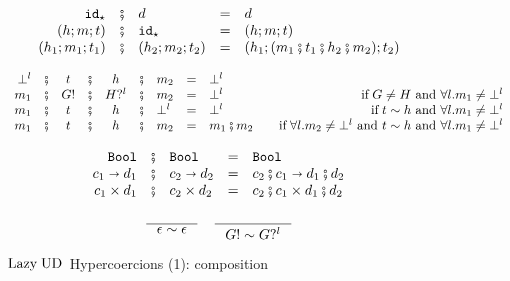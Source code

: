 \documentclass[runningheads]{llncs}
\newcommand{\infr}[2]{\inference{#1}{#2}}
\newcommand{\sidecond}[1]{\text{if}\;#1}
\newcommand{\LUD}{\ensuremath{\text{Lazy\;UD}}}
\newcommand{\Tdyn}[0]{\ensuremath{\star}}
\newcommand{\Pbool}[0]{\ensuremath{\mathtt{Bool}}}
\newcommand{\Pfunc}[2]{\ensuremath{#1 \shortrightarrow #2}}
\newcommand{\Pprod}[2]{\ensuremath{#1 \times #2}}
\newcommand{\cnfid}[1]{\ensuremath{\mathtt{id}_{#1}}}
\newcommand{\hcci}[0]{\cnfid{\Tdyn}}
\newcommand{\hccc}[3]{\ensuremath{(#1;#2;#3)}}
\newcommand{\hche}[0]{\ensuremath{\epsilon}}
\newcommand{\hchp}[2]{\ensuremath{#1?^{#2}}}
\newcommand{\hcmbool}[0]{\Pbool}
\newcommand{\hcmfunc}[2]{\Pfunc{#1}{#2}}
\newcommand{\hcmprod}[2]{\Pprod{#1}{#2}}
\newcommand{\hcmfail}[1]{\ensuremath{\bot^l}}
\newcommand{\hcte}[0]{\ensuremath{\epsilon}}
\newcommand{\hcti}[1]{\ensuremath{#1!}}
\newcommand{\compatibletailhead}[2]{\ensuremath{#1\sim#2}}
\begin{document}
\begin{figure}[tp]
	\[
	\begin{array}{rclcl}
		\hcci          
		& \fatsemi & d
		& = & d \\
		\hccc{h}{m}{t}
		& \fatsemi & \hcci
		& = & \hccc{h}{m}{t} \\
		\hccc{h_1}{m_1}{t_1}
		& \fatsemi & \hccc{h_2}{m_2}{t_2}
		& = & \hccc{h_1}{(m_1 \fatsemi t_1 \fatsemi h_2 \fatsemi m_2)}{t_2}
	\end{array}
	\]

	\[
	\begin{array}{rccccclclr}
	\hcmfail{l} 
	& \fatsemi & t
	& \fatsemi & h
	& \fatsemi & m_2
	& = & \hcmfail{l} \\
	m_1
	& \fatsemi & \hcti{G}
	& \fatsemi & \hchp{H}{l}
	& \fatsemi & m_2
	& = & \hcmfail{l}
	& \sidecond{G \neq H \text{ and } \forall l. m_1 \neq \hcmfail{l}} \\
	m_1
	& \fatsemi & t
	& \fatsemi & h
	& \fatsemi & \hcmfail{l}
	& = & \hcmfail{l}
	& \sidecond{\compatibletailhead{t}{h}
		\text{ and } \forall l. m_1 \neq \hcmfail{l}} \\
	m_1
	& \fatsemi & t
	& \fatsemi & h
	& \fatsemi & m_2
	& = & m_1 \fatsemi m_2
	& \quad \sidecond{
		\forall l. m_2 \neq \hcmfail{l}
		\text{ and } \compatibletailhead{t}{h}
		\text{ and } \forall l. m_1 \neq \hcmfail{l}} \\
	\end{array}
	\]
	
	\[
	\begin{array}{rclcl}
	\hcmbool
	& \fatsemi & \hcmbool
	& = & \hcmbool \\
	\hcmfunc{c_1}{d_1}
	& \fatsemi & \hcmfunc{c_2}{d_2}
	& = & \hcmfunc{c_2 \fatsemi c_1}{d_1 \fatsemi d_2} \\
	\hcmprod{c_1}{d_1}
	& \fatsemi & \hcmprod{c_2}{d_2}
	& = & \hcmprod{c_2 \fatsemi c_1}{d_1 \fatsemi d_2} \\
	\end{array}
	\]
	
	\fbox{\compatibletailhead{t}{h}}
	\begin{gather*}
	\infr{}{\compatibletailhead{\hcte}{\hche}}
	\quad
	\infr{}{\compatibletailhead{\hcti{G}}{\hchp{G}{l}}}
	\end{gather*}
	
\caption{\LUD\ Hypercoercions (1): composition}
\label{fig:LazyUD-Hypercoercions-composition}
\end{figure}
\end{document}

